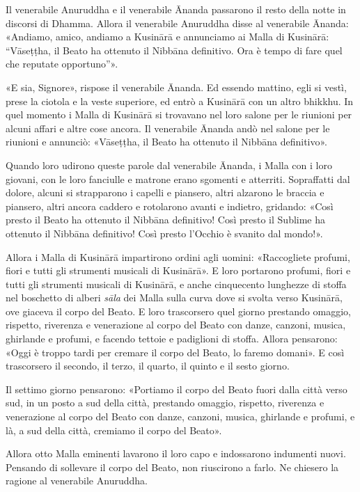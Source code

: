 Il venerabile Anuruddha e il venerabile Ānanda passarono il resto della
notte in discorsi di Dhamma. Allora il venerabile Anuruddha disse al
venerabile Ānanda: «Andiamo, amico, andiamo a Kusinārā e annunciamo ai
Malla di Kusinārā: “Vāseṭṭha, il Beato ha ottenuto il Nibbāna
definitivo. Ora è tempo di fare quel che reputate opportuno”».


«E sia, Signore», rispose il venerabile Ānanda. Ed essendo mattino, egli
si vestì, prese la ciotola e la veste superiore, ed entrò a Kusinārā con
un altro bhikkhu. In quel momento i Malla di Kusinārā si trovavano nel
loro salone per le riunioni per alcuni affari e altre cose ancora. Il
venerabile Ānanda andò nel salone per le riunioni e annunciò: «Vāseṭṭha,
il Beato ha ottenuto il Nibbāna definitivo».


Quando loro udirono queste parole dal venerabile Ānanda, i Malla con i
loro giovani, con le loro fanciulle e matrone erano sgomenti e
atterriti. Sopraffatti dal dolore, alcuni si strapparono i capelli e
piansero, altri alzarono le braccia e piansero, altri ancora caddero e
rotolarono avanti e indietro, gridando: «Così presto il Beato ha
ottenuto il Nibbāna definitivo! Così presto il Sublime ha ottenuto il
Nibbāna definitivo! Così presto l’Occhio è svanito dal mondo!».


Allora i Malla di Kusinārā impartirono ordini agli uomini: «Raccogliete
profumi, fiori e tutti gli strumenti musicali di Kusinārā». E loro
portarono profumi, fiori e tutti gli strumenti musicali di Kusinārā, e
anche cinquecento lunghezze di stoffa nel boschetto di alberi \emph{sāla} dei
Malla sulla curva dove si svolta verso Kusinārā, ove giaceva il corpo
del Beato. E loro trascorsero quel giorno prestando omaggio, rispetto,
riverenza e venerazione al corpo del Beato con danze, canzoni, musica,
ghirlande e profumi, e facendo tettoie e padiglioni di stoffa. Allora
pensarono: «Oggi è troppo tardi per cremare il corpo del Beato, lo
faremo domani». E così trascorsero il secondo, il terzo, il quarto, il
quinto e il sesto giorno.


Il settimo giorno pensarono: «Portiamo il corpo del Beato fuori dalla
città verso sud, in un posto a sud della città, prestando omaggio,
rispetto, riverenza e venerazione al corpo del Beato con danze, canzoni,
musica, ghirlande e profumi, e là, a sud della città, cremiamo il corpo
del Beato».


Allora otto Malla eminenti lavarono il loro capo e indossarono indumenti
nuovi. Pensando di sollevare il corpo del Beato, non riuscirono a farlo.
Ne chiesero la ragione al venerabile Anuruddha.


